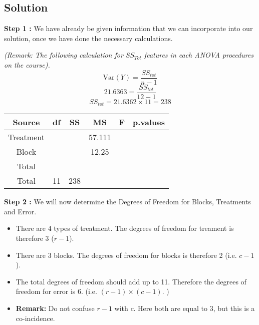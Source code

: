 \subsection*{Solution}


\noindent \textbf{Step 1 :} We have already be given information that we can incorporate into our solution, once we have done the necessary calculations.

\bigskip
\noindent \textit{(Remark: The following calculation for $SS_{Tot}$ features in each ANOVA procedures on the course).}
\[\textrm{Var}(Y) = \frac{ SS_{tot}}{n-1} \]
\[ 21.6363 = \frac{ SS_{tot}}{12-1} \]
\[ SS_{tot} = 21.6362 \times 11 = 238 \]
{
	\Large
	\begin{center}
		\begin{tabular}{|c|c|c|c|c|c|}
			\hline Source	       &	df	&	SS	&	MS	&	F	&	p.values	\\ \hline
			Treatment      &		&		&	57.111	&		&		\\ \hline
			Block	&		\phantom{spa}		&	\phantom{spa}		&	12.25	&		&		\\ \hline
			Total	&		&		&		\phantom{spa}		&	\phantom{spa}		&		\\ \hline 
			Total	&	11	&	238	&		&		&		\\ \hline  
		\end{tabular}
	\end{center}
}

\bigskip

\noindent \textbf{Step 2 :} We will now determine the Degrees of Freedom for Blocks, Treatments and Error.

\begin{itemize}
	\item There are 4 types of treatment. The degrees of freedom for treament is therefore 3 ($r-1$).
	\item There are 3 blocks. The degrees of freedom for blocks is therefore 2 (i.e. $c-1$). 
	\item The total degrees of freedom should add up to 11. Therefore the degrees of freedom for error is 6.
	(i.e. $(r-1)\times (c-1)$. )
	\item \textbf{Remark:} Do not confuse $r-1$ with $c$. Here both are equal to 3, but this is a co-incidence.
\end{itemize}

